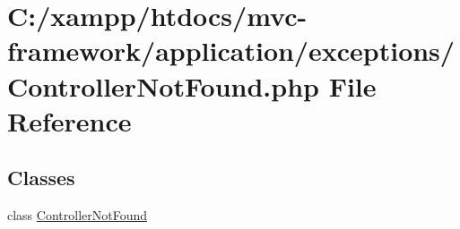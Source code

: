 \hypertarget{_controller_not_found_8php}{}\section{C\+:/xampp/htdocs/mvc-\/framework/application/exceptions/\+Controller\+Not\+Found.php File Reference}
\label{_controller_not_found_8php}
\subsection*{Classes}
\begin{DoxyCompactItemize}
\item 
class \hyperlink{class_controller_not_found}{Controller\+Not\+Found}
\end{DoxyCompactItemize}

